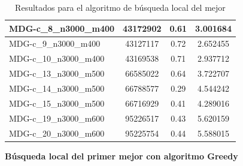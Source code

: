\documentclass[11pt,a4paper]{article}
\begin{document}
\begin{table}[H]
\begin{center}
\begin{tabular}{|l|c|c|c|}
			MDG-c\_8\_n3000\_m400 & 43172902 & 0.61 & 3.001684 \\ \hline
			MDG-c\_9\_n3000\_m400 & 43127117 & 0.72 & 2.652455 \\ \hline
			MDG-c\_10\_n3000\_m400 & 43169538 & 0.71 & 2.937712 \\ \hline
			MDG-c\_13\_n3000\_m500 & 66585022 & 0.64 & 3.722707 \\ \hline
			MDG-c\_14\_n3000\_m500 & 66788577 & 0.29 & 4.544242 \\ \hline
			MDG-c\_15\_n3000\_m500 & 66716929 & 0.41 & 4.289016 \\ \hline
			MDG-c\_19\_n3000\_m600 & 95226517 & 0.43 & 5.620159 \\ \hline
			MDG-c\_20\_n3000\_m600 & 95225754 & 0.44 & 5.588015 \\ \hline
		\end{tabular}
	\end{center}
	\caption{Resultados para el algoritmo de búsqueda local del mejor}
	\label{}
\end{table}
\newpage
\textbf{Búsqueda local del primer mejor con algoritmo Greedy}
\end{document}
